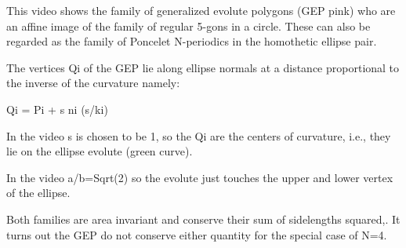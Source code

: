 This video shows the family of generalized evolute polygons (GEP pink) who are an affine image of the family of regular 5-gons in a circle. These can also be regarded as the family of Poncelet N-periodics in the homothetic ellipse pair.

The vertices Qi of the GEP lie along ellipse normals at a distance proportional to the inverse of the curvature namely:

Qi = Pi + s ni (s/ki)

In the video s is chosen to be 1, so the Qi are the centers of curvature, i.e., they lie on the ellipse evolute (green curve).

In the video a/b=Sqrt(2) so the evolute just touches the upper and lower vertex of the ellipse. 

Both families are area invariant and conserve their sum of sidelengths squared,. It turns out the GEP do not conserve either quantity for the special case of N=4.